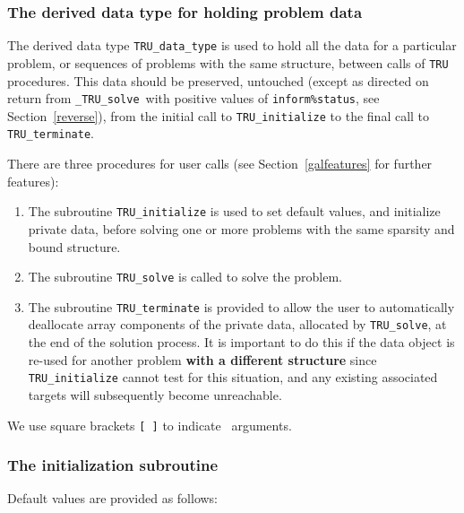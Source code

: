 \documentclass{galahad}
\newcommand{\packagename}{TRU}
\newcommand{\fullpackagename}{\libraryname\_\packagename}
\newcommand{\solver}{{\tt \fullpackagename\_solve}}
\begin{document}

\subsubsection{The derived data type for holding problem data}\label{typedata}
The derived data type
{\tt \packagename\_data\_type}
is used to hold all the data for a particular problem,
or sequences of problems with the same structure, between calls of
{\tt \packagename} procedures.
This data should be preserved, untouched (except as directed on
return from \solver\ with positive values of {\tt inform\%status}, see
Section~\ref{reverse}),
from the initial call to
{\tt \packagename\_initialize}
to the final call to
{\tt \packagename\_terminate}.





\galarguments
There are three procedures for user calls
(see Section~\ref{galfeatures} for further features):

\begin{enumerate}
\item The subroutine
      {\tt \packagename\_initialize}
      is used to set default values, and initialize private data,
      before solving one or more problems with the
      same sparsity and bound structure.
\item The subroutine
      {\tt \packagename\_solve}
      is called to solve the problem.
\item The subroutine
      {\tt \packagename\_terminate}
      is provided to allow the user to automatically deallocate array
       components of the private data, allocated by
       {\tt \packagename\_solve},
       at the end of the solution process.
       It is important to do this if the data object is re-used for another
       problem {\bf with a different structure}
       since {\tt \packagename\_initialize} cannot test for this situation,
       and any existing associated targets will subsequently become unreachable.
\end{enumerate}
We use square brackets {\tt [ ]} to indicate \optional\ arguments.


\subsubsection{The initialization subroutine}\label{subinit}
 Default values are provided as follows:
\vspace*{1mm}
\end{document}
